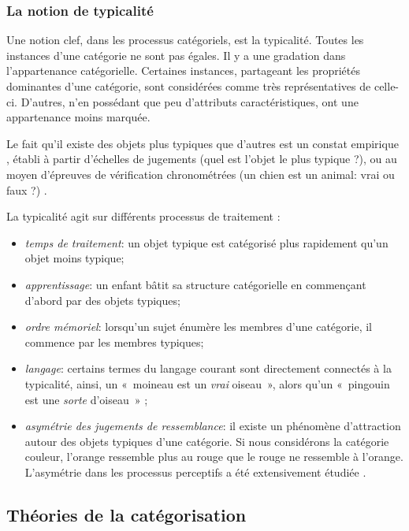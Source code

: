 \subsubsection{La notion de typicalité}
\label{sec:ch3_typicité}

Une notion clef, dans les processus catégoriels, est la typicalité. Toutes les instances d'une catégorie ne sont pas égales. Il y a une gradation dans l'appartenance catégorielle. Certaines instances, partageant les propriétés dominantes d'une catégorie, sont considérées comme très représentatives de celle-ci. D'autres, n'en possédant que peu d'attributs caractéristiques, ont une appartenance moins marquée.

Le fait qu'il existe des objets plus typiques que d'autres est un constat empirique \citep[p. 37]{rosch1978cognition,mervis1981categorization}, établi à partir d'échelles de jugements (quel est l'objet le plus typique ?), ou au moyen d'épreuves de vérification chronométrées (un chien est un animal: vrai ou faux ?) \citep[p. 41]{dubois1991semantique}.

La typicalité agit sur différents processus de traitement \citep[p. 51]{Houix03f,mervis1981categorization}:

\begin{itemize}
\item \emph{temps de traitement}: un objet typique est catégorisé plus rapidement qu'un objet moins typique;
\item \emph{apprentissage}: un enfant bâtit sa structure catégorielle en commençant d'abord par des objets typiques;
\item \emph{ordre mémoriel}: lorsqu'un sujet énumère les membres d'une catégorie, il commence par les membres typiques;
\item \emph{langage}: certains termes du langage courant sont directement connectés à la typicalité, ainsi, un «~moineau est un \emph{vrai} oiseau~», alors qu'un «~pingouin est une \emph{sorte} d'oiseau~» \citep{mervis1981categorization};
\item \emph{asymétrie des jugements de ressemblance}: il existe un phénomène d'attraction autour des objets typiques d'une catégorie. Si nous considérons la catégorie couleur, l'orange ressemble plus au rouge que le rouge ne ressemble à l'orange. L'asymétrie dans les processus perceptifs a été extensivement étudiée \citep{tversky1977features,krumhansl1978concerning}.
\end{itemize}

\subsection{Théories de la catégorisation}
\label{sec:ch3_categoTheo}

